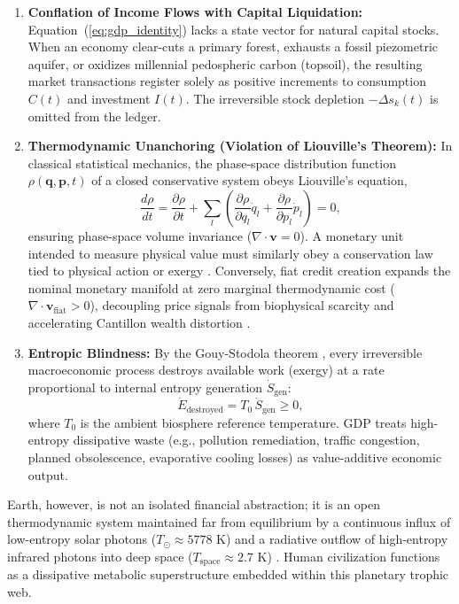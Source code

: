 \documentclass[aps,pre,twocolumn,10pt,superscriptaddress,amsmath,amssymb,amsfonts,floatfix,showkeys]{revtex4-2}
\begin{document}
\begin{enumerate}
    \item \textbf{Conflation of Income Flows with Capital Liquidation:} Equation~(\ref{eq:gdp_identity}) lacks a state vector for natural capital stocks. When an economy clear-cuts a primary forest, exhausts a fossil piezometric aquifer, or oxidizes millennial pedospheric carbon (topsoil), the resulting market transactions register solely as positive increments to consumption $C(t)$ and investment $I(t)$. The irreversible stock depletion $-\Delta s_k(t)$ is omitted from the ledger.
    \item \textbf{Thermodynamic Unanchoring (Violation of Liouville's Theorem):} In classical statistical mechanics, the phase-space distribution function $\rho(\bm{q}, \bm{p}, t)$ of a closed conservative system obeys Liouville's equation,
    \begin{equation}
        \frac{d\rho}{dt} = \frac{\partial \rho}{\partial t} + \sum_{l} \left( \frac{\partial \rho}{\partial q_l}\dot{q}_l + \frac{\partial \rho}{\partial p_l}\dot{p}_l \right) = 0,
        \label{eq:liouville}
    \end{equation}
    ensuring phase-space volume invariance ($\nabla \cdot \bm{v} = 0$). A monetary unit intended to measure physical value must similarly obey a conservation law tied to physical action or exergy \cite{Mirowski1989, Yakovenko2009}. Conversely, fiat credit creation expands the nominal monetary manifold at zero marginal thermodynamic cost ($\nabla \cdot \bm{v}_{\text{fiat}} > 0$), decoupling price signals from biophysical scarcity and accelerating Cantillon wealth distortion \cite{Alden2023, Booth2020, Lepard2025}.
    \item \textbf{Entropic Blindness:} By the Gouy-Stodola theorem \cite{Bejan2016}, every irreversible macroeconomic process destroys available work (exergy) at a rate proportional to internal entropy generation $\dot{S}_{\text{gen}}$:
    \begin{equation}
        \dot{E}_{\text{destroyed}} = T_0 \, \dot{S}_{\text{gen}} \ge 0,
        \label{eq:gouy_stodola}
    \end{equation}
    where $T_0$ is the ambient biosphere reference temperature. GDP treats high-entropy dissipative waste (e.g., pollution remediation, traffic congestion, planned obsolescence, evaporative cooling losses) as value-additive economic output.
\end{enumerate}

Earth, however, is not an isolated financial abstraction; it is an open thermodynamic system maintained far from equilibrium by a continuous influx of low-entropy solar photons ($T_{\odot} \approx 5778\text{ K}$) and a radiative outflow of high-entropy infrared photons into deep space ($T_{\text{space}} \approx 2.7\text{ K}$) \cite{Kleidon2016, Lovelock1979}. Human civilization functions as a dissipative metabolic superstructure embedded within this planetary trophic web.
\end{document}
